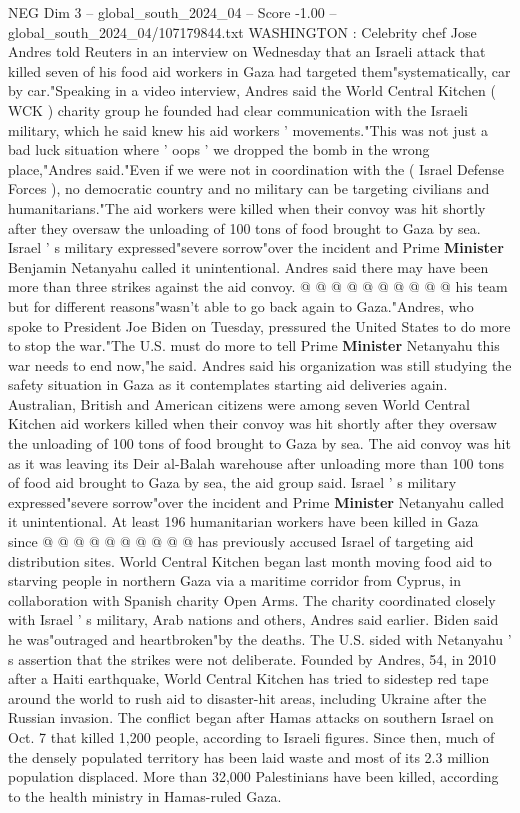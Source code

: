 \begin{textsample}{NEG Dim 3 – global\_south\_2024\_04 – Score -1.00 – global\_south\_2024\_04/107179844.txt}  \label{ex:f3_neg_245}
WASHINGTON : Celebrity chef Jose Andres told Reuters in an interview on Wednesday that an Israeli attack that killed seven of his food aid workers in Gaza had targeted them"systematically, car by car."Speaking in a video interview, Andres said the World Central Kitchen ( WCK ) charity group he founded had clear communication with the Israeli military, which he said knew his aid workers ' movements."This was not just a bad luck situation where ' oops ' we dropped the bomb in the wrong place,"Andres said."Even if we were not in coordination with the ( Israel Defense Forces ), no democratic country and no military can be targeting civilians and humanitarians."The aid workers were killed when their convoy was hit shortly after they oversaw the unloading of 100 tons of food brought to Gaza by sea.
Israel ' s military expressed"severe sorrow"over the incident and Prime \textbf{Minister} Benjamin Netanyahu called it unintentional.
Andres said there may have been more than three strikes against the aid convoy. @ @ @ @ @ @ @ @ @ @ his team but for different reasons"wasn't able to go back again to Gaza."Andres, who spoke to President Joe Biden on Tuesday, pressured the United States to do more to stop the war."The U.S. must do more to tell Prime \textbf{Minister} Netanyahu this war needs to end now,"he said.
Andres said his organization was still studying the safety situation in Gaza as it contemplates starting aid deliveries again.
Australian, British and American citizens were among seven World Central Kitchen aid workers killed when their convoy was hit shortly after they oversaw the unloading of 100 tons of food brought to Gaza by sea.
The aid convoy was hit as it was leaving its Deir al-Balah warehouse after unloading more than 100 tons of food aid brought to Gaza by sea, the aid group said.
Israel ' s military expressed"severe sorrow"over the incident and Prime \textbf{Minister} Netanyahu called it unintentional.
At least 196 humanitarian workers have been killed in Gaza since @ @ @ @ @ @ @ @ @ @ has previously accused Israel of targeting aid distribution sites.
World Central Kitchen began last month moving food aid to starving people in northern Gaza via a maritime corridor from Cyprus, in collaboration with Spanish charity Open Arms.
The charity coordinated closely with Israel ' s military, Arab nations and others, Andres said earlier.
Biden said he was"outraged and heartbroken"by the deaths.
The U.S. sided with Netanyahu ' s assertion that the strikes were not deliberate.
Founded by Andres, 54, in 2010 after a Haiti earthquake, World Central Kitchen has tried to sidestep red tape around the world to rush aid to disaster-hit areas, including Ukraine after the Russian invasion.
The conflict began after Hamas attacks on southern Israel on Oct. 7 that killed 1,200 people, according to Israeli figures.
Since then, much of the densely populated territory has been laid waste and most of its 2.3 million population displaced.
More than 32,000 Palestinians have been killed, according to the health ministry in Hamas-ruled Gaza.

\end{textsample}
